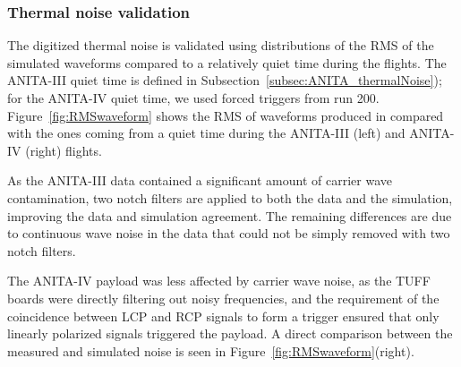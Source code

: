 \subsubsection{Thermal noise validation}
\label{subsec:ANITA_validation_thermalNoise}
The digitized thermal noise is validated using distributions of
the RMS of the simulated waveforms compared to a relatively quiet time
during the flights.
The ANITA-III quiet time is defined in Subsection~\ref{subsec:ANITA_thermalNoise}); for the ANITA-IV quiet time, we used forced triggers from run 200.
Figure~\ref{fig:RMSwaveform} shows the RMS of waveforms produced
in \icemc compared with the ones coming from a quiet time during
the ANITA-III (left) and ANITA-IV (right) flights.

As the ANITA-III data contained a significant amount of carrier wave
contamination, two notch filters are applied to both the data and the
simulation, improving the data and simulation agreement.
The remaining differences are due to continuous wave noise in the data that
could not be simply removed with two notch filters.

The ANITA-IV payload was less affected by carrier wave noise, as the TUFF boards were directly filtering out noisy frequencies, and the requirement of the coincidence between LCP and RCP signals to form a trigger ensured that only linearly polarized signals triggered the payload.
A direct comparison between the measured and simulated noise is seen in Figure~\ref{fig:RMSwaveform}(right). 

